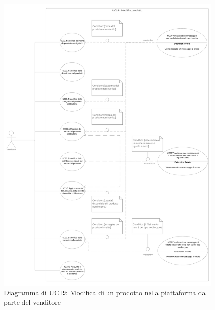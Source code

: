 \begin{figure}[H]
    \centering
    \includegraphics[scale=0.1]{Immagini/DiagrammiUC/UC19ModificaProdotto.png}
    \caption{Diagramma di UC19: Modifica di un prodotto nella piattaforma da parte del venditore}
    \label{fig:ModificaProdotto}
\end{figure}

